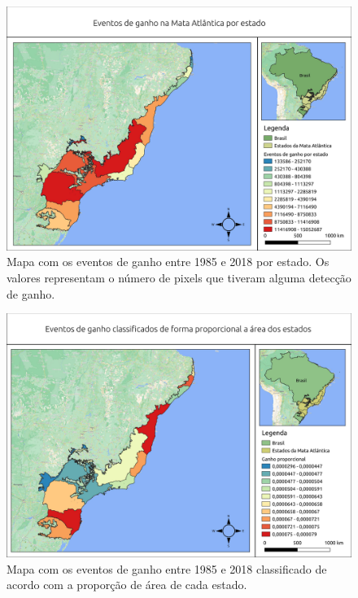 \begin{figure}[H]
    \centering
    \includegraphics[scale=.5]{images/estados_gain_seg6_masked18_dur_gt4_inv_for.pdf}
    \caption{Mapa com os eventos de ganho entre 1985 e 2018 por estado. Os valores representam o número de pixels que tiveram alguma detecção de ganho.}
    \label{fig:estados_gain}
\end{figure}

\begin{figure}[H]
    \centering
    \includegraphics[scale=.5]{images/estado_gain_proporcional.pdf}
    \caption{Mapa com os eventos de ganho entre 1985 e 2018 classificado de acordo com a proporção de área de cada estado.}
    \label{fig:estados_gain_proporcional}
\end{figure}

